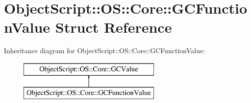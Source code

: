 \hypertarget{struct_object_script_1_1_o_s_1_1_core_1_1_g_c_function_value}{}\section{Object\+Script\+:\+:OS\+:\+:Core\+:\+:G\+C\+Function\+Value Struct Reference}
\label{struct_object_script_1_1_o_s_1_1_core_1_1_g_c_function_value}
Inheritance diagram for Object\+Script\+:\+:OS\+:\+:Core\+:\+:G\+C\+Function\+Value\+:\begin{figure}[H]
\begin{center}
\leavevmode
\includegraphics[height=2.000000cm]{struct_object_script_1_1_o_s_1_1_core_1_1_g_c_function_value}
\end{center}
\end{figure}

